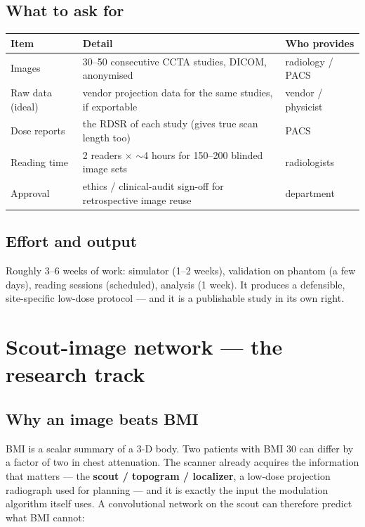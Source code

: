 \documentclass[10pt,a4paper]{article}
\newcommand{\hdr}{\rowcolor{ctsurf}}
\begin{document}
\subsection{What to ask for}
\begin{table}[h]\footnotesize
\begin{tabularx}{\linewidth}{@{}l L l@{}}
\toprule
\hdr \textbf{Item} & \textbf{Detail} & \textbf{Who provides}\\
\midrule
Images & 30--50 consecutive CCTA studies, DICOM, anonymised & radiology / PACS\\
Raw data (ideal) & vendor projection data for the same studies, if exportable & vendor / physicist\\
Dose reports & the RDSR of each study (gives true scan length too) & PACS\\
Reading time & 2 readers $\times$ $\sim$4 hours for 150--200 blinded image sets & radiologists\\
Approval & ethics / clinical-audit sign-off for retrospective image reuse & department\\
\bottomrule
\end{tabularx}
\end{table}

\subsection{Effort and output}
Roughly 3--6 weeks of work: simulator (1--2 weeks), validation on phantom (a few days), reading sessions
(scheduled), analysis (1 week). It produces a defensible, site-specific low-dose protocol --- and it is a
publishable study in its own right.

\section{Scout-image network --- the research track}

\subsection{Why an image beats BMI}
BMI is a scalar summary of a 3-D body. Two patients with BMI 30 can differ by a factor of two in chest attenuation.
The scanner already acquires the information that matters --- the \textbf{scout / topogram / localizer}, a
low-dose projection radiograph used for planning --- and it is exactly the input the modulation algorithm itself
uses. A convolutional network on the scout can therefore predict what BMI cannot:
\end{document}

